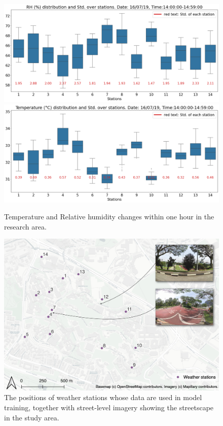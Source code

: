 \documentclass[a4paper,fleqn]{cas-sc}
\begin{document}
\begin{figure}[!h]
	\centering
        	\includegraphics[scale=0.38]{figs/new_figs/RH14pm.png}
	    \includegraphics[scale=0.38]{figs/new_figs/tem14pm.png}
	\caption{Temperature and Relative humidity changes within one hour in the research area.}
	\label{FIG:weatherData14pm}
\end{figure}

\begin{figure}[!h]
	\centering
	\includegraphics[width=.95\textwidth]{figs/map2_.png}
	\caption{The positions of weather stations whose data are used in model training, together with street-level imagery showing the streetscape in the study area.}
	\label{FIG:map}
\end{figure}
\end{document}
